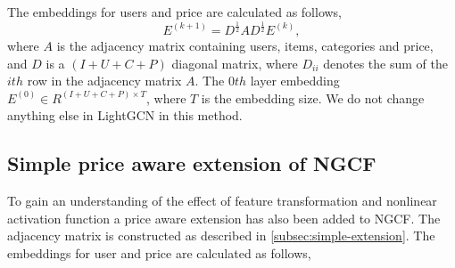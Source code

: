 The embeddings for users and price are calculated as follows,
\begin{equation}
    E^{(k+1)} = D^{\frac{1}{2}}AD^{\frac{1}{2}}E^{(k)},
\end{equation}
where $A$ is the adjacency matrix containing users, items, categories and price, and $D$ is a $(I + U + C + P)$ diagonal matrix, where $D_{ii}$ denotes the sum of the $ith$ row in the adjacency matrix $A$.
The $0th$ layer embedding $E^{(0)} \in R^{(I + U + C + P)\times T}$, where $T$ is the embedding size.
We do not change anything else in LightGCN in this method.

\subsection{Simple price aware extension of NGCF}
To gain an understanding of the effect of feature transformation and nonlinear activation function a price aware extension has also been added to NGCF.
The adjacency matrix is constructed as described in \autoref{subsec:simple-extension}.
The embeddings for user and price are calculated as follows,
